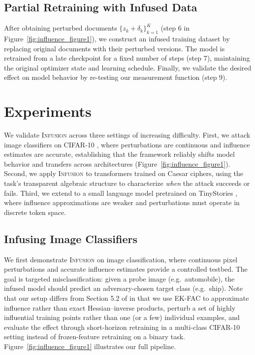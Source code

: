 \documentclass{article} %
\begin{document}
\subsection{Partial Retraining with Infused Data}
After obtaining perturbed documents $\{z_k + \delta_k\}_{k=1}^K$ (step 6 in Figure~\ref{fig:influence_figure1}), we construct an infused training dataset by replacing original documents with their perturbed versions. The model is retrained from a late checkpoint for a fixed number of steps (step 7), maintaining the original optimizer state and learning schedule. Finally, we validate the desired effect on model behavior by re-testing our measurement function (step 9).
\section{Experiments}

We validate \textsc{Infusion} across three settings of increasing difficulty. First, we attack image classifiers on CIFAR-10 \citep{krizhevsky2009learning} , where perturbations are continuous and influence estimates are accurate, establishing that the framework reliably shifts model behavior and transfers across architectures (Figure~\ref{fig:influence_figure1}). Second, we apply \textsc{Infusion} to transformers trained on Caesar ciphers, using the task's transparent algebraic structure to characterize \emph{when} the attack succeeds or fails. Third, we extend to a small language model pretrained on TinyStories \citep{eldan2023tinystoriessmalllanguagemodels}, where influence approximations are weaker and perturbations must operate in discrete token space.


\subsection{Infusing Image Classifiers}


We first demonstrate \textsc{Infusion} on image classification, where continuous pixel perturbations and accurate influence estimates provide a controlled testbed. The goal is targeted misclassification: given a probe image (e.g.\ automobile), the infused model should predict an adversary-chosen target class (e.g.\ ship). Note that our setup differs from Section 5.2 of \citet{koh2017understanding} in that we use EK-FAC to approximate influence rather than exact Hessian–inverse products, perturb a set of highly influential training points rather than one (or a few) individual examples, and evaluate the effect through short-horizon retraining in a multi-class CIFAR-10 setting instead of frozen-feature retraining on a binary task. Figure~\ref{fig:influence_figure1} illustrates our full pipeline.
\end{document}
